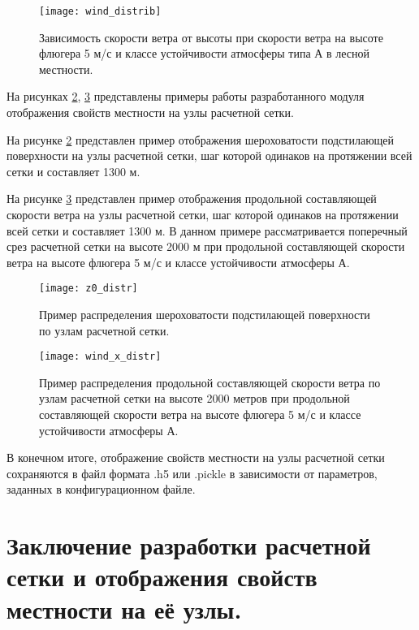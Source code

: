 \begin{figure}[ht]
    \centering
    \texttt{[image: wind\_distrib]}
    \captionsetup{justification=centering}
    \caption{Зависимость скорости ветра от высоты при скорости ветра на высоте флюгера 5 м/с и классе устойчивости 
        атмосферы типа А в лесной местности.}
    \label{fig_wind_distrib}
\end{figure}

На рисунках \ref{fig_z0_distrib}, \ref{fig_wind_x_distrib} представлены примеры работы разработанного модуля отображения 
свойств местности на узлы расчетной сетки. 

На рисунке \ref{fig_z0_distrib} представлен пример отображения шероховатости подстилающей поверхности на узлы расчетной 
сетки, шаг которой одинаков на протяжении всей сетки и составляет 1300 м.

На рисунке \ref{fig_wind_x_distrib} представлен пример отображения продольной составляющей скорости ветра на узлы 
расчетной сетки, шаг которой одинаков на протяжении всей сетки и составляет 1300 м. В данном примере рассматривается 
поперечный срез расчетной сетки на высоте 2000 м при продольной составляющей скорости ветра на высоте флюгера 5 м/с и 
классе устойчивости атмосферы А.

\begin{figure}[ht]
    \centering
    \texttt{[image: z0\_distr]}
    \captionsetup{justification=centering}
    \caption{Пример распределения шероховатости подстилающей поверхности по узлам расчетной сетки.}
    \label{fig_z0_distrib}
\end{figure}

\begin{figure}[ht]
    \centering
    \texttt{[image: wind\_x\_distr]}
    \captionsetup{justification=centering}
    \caption{Пример распределения продольной составляющей скорости ветра по узлам расчетной сетки на высоте 2000 метров 
        при продольной составляющей скорости ветра на высоте флюгера 5 м/с и классе устойчивости атмосферы А.}
    \label{fig_wind_x_distrib}
\end{figure}

В конечном итоге, отображение свойств местности на узлы расчетной сетки сохраняются в файл формата .h5 или .pickle в 
зависимости от параметров, заданных в конфигурационном файле. 

\section{Заключение разработки расчетной сетки и отображения свойств местности на её узлы.}

